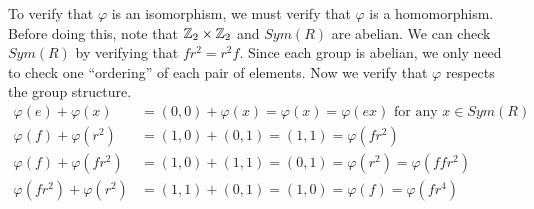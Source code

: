 \documentclass[11pt]{article}
\begin{document}
{        To verify that $\varphi$ is an isomorphism, we must verify that $\varphi$ is a homomorphism.
        Before doing this, note that $\mathbb{Z} _2 \times \mathbb{Z} _2$ and $Sym (R)$ are abelian.
        We can check $Sym (R)$ by verifying that $ f r^2 = r^2 f$.
        Since each group is abelian, we only need to check one ``ordering'' of each pair of elements.
        Now we verify that $\varphi$ respects the group structure.
        \begin{align*}
            \varphi (e) + \varphi (x) &= (0, 0) + \varphi (x) = \varphi (x) = \varphi (e x) \text{ for any } x \in Sym(R) \\
            \varphi (f) + \varphi (r^2) &= (1,0) + (0,1) = (1,1) = \varphi (f r^2) \\
            \varphi (f) + \varphi (fr^2) &= (1,0) + (1,1) = (0,1) = \varphi (r^2) = \varphi (ff r^2) \\
            \varphi (f r^2) + \varphi (r^2) &= (1,1) + (0,1) = (1,0) = \varphi (f) = \varphi (f r^4) \\
        \end{align*}
    }
\end{document}
